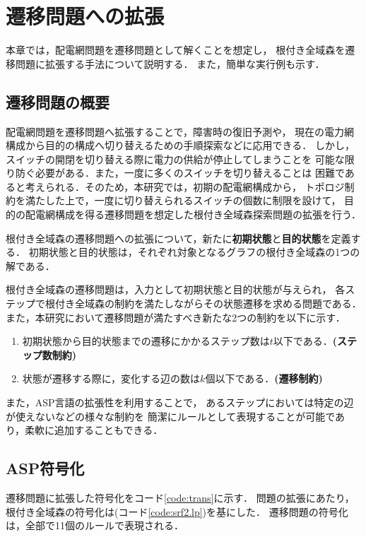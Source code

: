 \chapter{遷移問題への拡張} \label{chap:trans}

本章では，配電網問題を遷移問題として解くことを想定し，
根付き全域森を遷移問題に拡張する手法について説明する．
また，簡単な実行例も示す．

\section{遷移問題の概要}
配電網問題を遷移問題へ拡張することで，障害時の復旧予測や，
現在の電力網構成から目的の構成へ切り替えるための手順探索などに応用できる．
しかし，スイッチの開閉を切り替える際に電力の供給が停止してしまうことを
可能な限り防ぐ必要がある．また，一度に多くのスイッチを切り替えることは
困難であると考えられる．そのため，本研究では，初期の配電網構成から，
トポロジ制約を満たした上で，一度に切り替えられるスイッチの個数に制限を設けて，
目的の配電網構成を得る遷移問題を想定した根付き全域森探索問題の拡張を行う．

根付き全域森の遷移問題への拡張について，新たに\textbf{初期状態}と\textbf{目的状態}を定義する．
初期状態と目的状態は，それぞれ対象となるグラフの根付き全域森の1つの解である．

根付き全域森の遷移問題は，入力として初期状態と目的状態が与えられ，
各ステップで根付き全域森の制約を満たしながらその状態遷移を求める問題である．
また，本研究において遷移問題が満たすべき新たな2つの制約を以下に示す．
\begin{enumerate}
 \item 初期状態から目的状態までの遷移にかかるステップ数は$t$以下である．\textbf{(ステップ数制約)}
 \item 状態が遷移する際に，変化する辺の数は$k$個以下である．\textbf{(遷移制約)}
\end{enumerate}


また，ASP言語の拡張性を利用することで，
あるステップにおいては特定の辺が使えないなどの様々な制約を
簡潔にルールとして表現することが可能であり，柔軟に追加することもできる．

\section{ASP符号化}
遷移問題に拡張した符号化をコード\ref{code:trans}に示す．
問題の拡張にあたり，根付き全域森の符号化は(コード\ref{code:srf2.lp})を基にした．
遷移問題の符号化は，全部で11個のルールで表現される．

